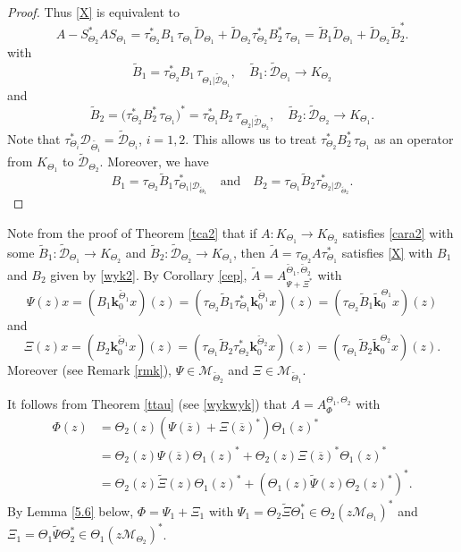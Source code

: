\documentclass[11pt]{amsart}
\numberwithin{equation}{section}
\newcommand{\dcf}[1]{\widetilde{D}_{\Theta_#1}}
\newcommand{\ke}{{\mathbf{k}}}
\theoremstyle{definition}
\numberwithin{equation}{section}
\begin{document}
\begin{proof}
Thus \eqref{X} is equivalent to
	\begin{equation*}
A-S_{\Theta_2}^*AS_{\Theta_1}=\tau_{\Theta_2}^*B_1\,\tau_{\Theta_1}\dcf{1}+\dcf{2}\tau_{\Theta_2}^*B_2^*\,\tau_{\Theta_1}=\widetilde{B}_1\dcf{1}+\dcf{2}\widetilde{B}_2^*.
\end{equation*}
with
$$\widetilde{B}_1=\tau_{\Theta_2}^*B_1\,\tau_{\Theta_1|\widetilde{\mathcal{D}}_{\Theta_{1}}},\quad \widetilde{B}_1:\widetilde{\mathcal{D}}_{\Theta_{1}}\to K_{\Theta_{2}}$$
and
$$\widetilde{B}_2=\big(\tau_{\Theta_2}^*B_2^*\,\tau_{\Theta_1}\big)%
^*=\tau_{\Theta_1}^*B_2\,\tau_{\Theta_2|\widetilde{\mathcal{D}}_{\Theta_{2}}},\quad \widetilde{B}_2:\widetilde{\mathcal{D}}_{\Theta_{2}}\to K_{\Theta_{1}}.$$
Note that $\tau_{\Theta_i}^*{\mathcal{D}}_{\widetilde{\Theta_{i}}}=\widetilde{\mathcal{D}}_{\Theta_{i}}$, $i=1,2$. This allows us to treat $\tau_{\Theta_2}^*B_2^*\,\tau_{\Theta_1}$ as an operator from $K_{\Theta_{1}}$ to $\widetilde{\mathcal{D}}_{\Theta_{2}}$. Moreover, we have
\begin{equation}\label{wyk2}
B_1=\tau_{\Theta_2}\widetilde{B}_1
\tau_{\Theta_1|{\mathcal{D}}_{\widetilde{\Theta}_{1}}}^*\quad\text{and}\quad B_2=\tau_{\Theta_1}\widetilde{B}_2
\tau_{\Theta_2|{\mathcal{D}}_{\widetilde{\Theta}_{2}}}^*.
\end{equation}
\end{proof}
Note from the proof of Theorem \ref{tca2} that if $A:K_{\Theta_1}\to K_{\Theta_2}$ satisfies \eqref{cara2} with some $\widetilde{B}_1:\widetilde{\mathcal{D}}_{\Theta_1}\to K_{\Theta_2}$ and $\widetilde{B}_2:\widetilde{\mathcal{D}}_{\Theta_2}\to K_{\Theta_1}$, then
$\widetilde{A}=\tau_{\Theta_2}A\tau_{\Theta_1}^*$ satisfies \eqref{X} with $B_1$ and $B_2$ given by \eqref{wyk2}. By Corollary \ref{cep}, $\widetilde{A}=A_{\Psi+\Xi^*}^{\widetilde{\Theta}_1, \widetilde{\Theta}_2}$ with
$$\Psi(z)x=(B_1\ke_{0}^{\widetilde{\Theta}_1}x)(z)
=(\tau_{\Theta_2}\widetilde{B}_1\tau^*_{\Theta_1}\ke_{0}^{\widetilde{\Theta}_1}x)(z)=(\tau_{\Theta_2}\widetilde{B}_1\widetilde{\ke}_{0}^{\Theta_1}x)(z)$$
and
$$\Xi(z)x=(B_2\ke_{0}^{\widetilde{\Theta}_1}x)(z)=(\tau_{\Theta_1}\widetilde{B}_2\tau^*_{\Theta_2}\ke_{0}^{\widetilde{\Theta}_2}x)(z)
=(\tau_{\Theta_1}\widetilde{B}_2\widetilde{\ke}_{0}^{\Theta_2}x)(z).$$
Moreover (see Remark \ref{rmk}), $\Psi\in \mathcal{M}_{\widetilde{\Theta}_2}$ and $\Xi\in \mathcal{M}_{\widetilde{\Theta}_1}$.

It follows from Theorem \ref{ttau} (see \eqref{wykwyk}) that $A=A_{\Phi}^{\Theta_1, \Theta_2}$ with
\begin{align*}
\Phi(z)
&=\Theta_2(z)(\Psi(\overline{z})+\Xi(\overline{z})^*)\Theta_1(z)^*\\
&=\Theta_2(z)\Psi(\overline{z})\Theta_1(z)^*+\Theta_2(z)\Xi(\overline{z})^*\Theta_1(z)^*\\
&=\Theta_2(z)\widetilde{\Xi}(z)\Theta_1(z)^*+(\Theta_1(z)\widetilde{\Psi}(z)\Theta_2(z)^*)^*.
\end{align*}
By Lemma \ref{5.6} below, $\Phi=\Psi_1+\Xi_1$ with $\Psi_1=\Theta_2\widetilde{\Xi}\Theta_1^*\in
\Theta_2(z\mathcal{M}_{\Theta_1})^*$ and $\Xi_{1}=\Theta_1\widetilde{\Psi}\Theta_2^*\in \Theta_1(z\mathcal{M}_{\Theta_2})^*$.
\end{document}
